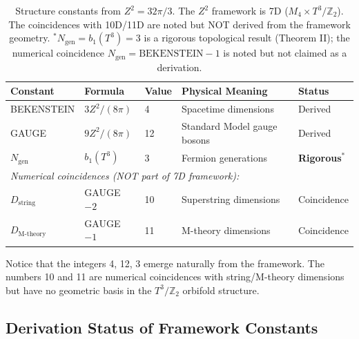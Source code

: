 \documentclass[11pt,a4paper]{article}
\theoremstyle{plain}
\theoremstyle{definition}
\theoremstyle{remark}
\newcommand{\Ngen}{N_{\text{gen}}}
\begin{document}
\begin{table}[h!]
\centering
\begin{tabular}{lllll}
\toprule
\textbf{Constant} & \textbf{Formula} & \textbf{Value} & \textbf{Physical Meaning} & \textbf{Status} \\
\midrule
BEKENSTEIN & $3Z^2/(8\pi)$ & 4 & Spacetime dimensions & Derived \\
GAUGE & $9Z^2/(8\pi)$ & 12 & Standard Model gauge bosons & Derived \\
$\Ngen$ & $b_1(T^3)$ & 3 & Fermion generations & \textbf{Rigorous}$^*$ \\
\midrule
\multicolumn{5}{l}{\textit{Numerical coincidences (NOT part of 7D framework):}} \\
$D_{\text{string}}$ & GAUGE $- 2$ & 10 & Superstring dimensions & Coincidence \\
$D_{\text{M-theory}}$ & GAUGE $- 1$ & 11 & M-theory dimensions & Coincidence \\
\bottomrule
\end{tabular}
\caption{Structure constants from $Z^2 = 32\pi/3$. The $Z^2$ framework is 7D ($M_4 \times T^3/\mathbb{Z}_2$). The coincidences with 10D/11D are noted but NOT derived from the framework geometry. $^*$$\Ngen = b_1(T^3) = 3$ is a rigorous topological result (Theorem II); the numerical coincidence $\Ngen = \text{BEKENSTEIN} - 1$ is noted but not claimed as a derivation.}
\end{table}

Notice that the integers 4, 12, 3 emerge naturally from the framework. The numbers 10 and 11 are numerical coincidences with string/M-theory dimensions but have no geometric basis in the $T^3/\mathbb{Z}_2$ orbifold structure.

\subsection{Derivation Status of Framework Constants}
\end{document}

